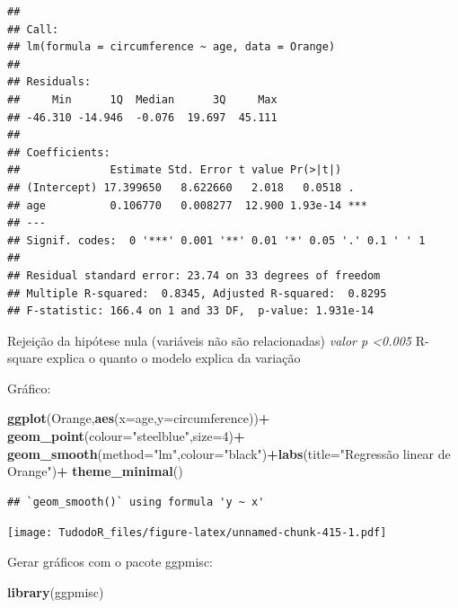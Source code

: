 \documentclass[
]{book}
\newenvironment{Shaded}{\begin{snugshade}}{\end{snugshade}}
\newcommand{\DataTypeTok}[1]{\textcolor[rgb]{0.13,0.29,0.53}{#1}}
\newcommand{\DecValTok}[1]{\textcolor[rgb]{0.00,0.00,0.81}{#1}}
\newcommand{\KeywordTok}[1]{\textcolor[rgb]{0.13,0.29,0.53}{\textbf{#1}}}
\newcommand{\NormalTok}[1]{#1}
\newcommand{\OperatorTok}[1]{\textcolor[rgb]{0.81,0.36,0.00}{\textbf{#1}}}
\newcommand{\StringTok}[1]{\textcolor[rgb]{0.31,0.60,0.02}{#1}}
\begin{document}
\begin{verbatim}
## 
## Call:
## lm(formula = circumference ~ age, data = Orange)
## 
## Residuals:
##     Min      1Q  Median      3Q     Max 
## -46.310 -14.946  -0.076  19.697  45.111 
## 
## Coefficients:
##              Estimate Std. Error t value Pr(>|t|)    
## (Intercept) 17.399650   8.622660   2.018   0.0518 .  
## age          0.106770   0.008277  12.900 1.93e-14 ***
## ---
## Signif. codes:  0 '***' 0.001 '**' 0.01 '*' 0.05 '.' 0.1 ' ' 1
## 
## Residual standard error: 23.74 on 33 degrees of freedom
## Multiple R-squared:  0.8345, Adjusted R-squared:  0.8295 
## F-statistic: 166.4 on 1 and 33 DF,  p-value: 1.931e-14
\end{verbatim}

Rejeição da hipótese nula (variáveis não são relacionadas)
\emph{valor p \textless0.005}
R-square explica o quanto o modelo explica da variação

Gráfico:

\begin{Shaded}
\begin{Highlighting}[]
\KeywordTok{ggplot}\NormalTok{(Orange,}\KeywordTok{aes}\NormalTok{(}\DataTypeTok{x=}\NormalTok{age,}\DataTypeTok{y=}\NormalTok{circumference))}\OperatorTok{+}\StringTok{ }\KeywordTok{geom_point}\NormalTok{(}\DataTypeTok{colour=}\StringTok{"steelblue"}\NormalTok{,}\DataTypeTok{size=}\DecValTok{4}\NormalTok{)}\OperatorTok{+}
\StringTok{  }\KeywordTok{geom_smooth}\NormalTok{(}\DataTypeTok{method=}\StringTok{"lm"}\NormalTok{,}\DataTypeTok{colour=}\StringTok{"black"}\NormalTok{)}\OperatorTok{+}\KeywordTok{labs}\NormalTok{(}\DataTypeTok{title=}\StringTok{"Regressão linear de Orange"}\NormalTok{)}\OperatorTok{+}
\StringTok{  }\KeywordTok{theme_minimal}\NormalTok{()  }
\end{Highlighting}
\end{Shaded}

\begin{verbatim}
## `geom_smooth()` using formula 'y ~ x'
\end{verbatim}

\texttt{[image: TudodoR\_files/figure-latex/unnamed-chunk-415-1.pdf]}

Gerar gráficos com o pacote ggpmisc:

\begin{Shaded}
\begin{Highlighting}[]
\KeywordTok{library}\NormalTok{(ggpmisc)}
\end{Highlighting}
\end{Shaded}
\end{document}
